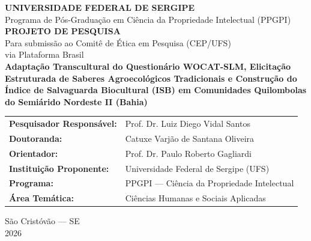 \documentclass[12pt,a4paper,brazil]{article}
\begin{document}
\begin{titlepage}
\centering
\vspace*{2cm}

{\Large\bfseries UNIVERSIDADE FEDERAL DE SERGIPE}\\[0.3cm]
{\large Programa de Pós-Graduação em Ciência da Propriedade Intelectual (PPGPI)}\\[2cm]

{\LARGE\bfseries PROJETO DE PESQUISA}\\[0.5cm]
{\large Para submissão ao Comitê de Ética em Pesquisa (CEP/UFS)\\via Plataforma Brasil}\\[2cm]

{\Large\bfseries Adaptação Transcultural do Questionário WOCAT-SLM, Elicitação Estruturada de Saberes Agroecológicos Tradicionais e Construção do Índice de Salvaguarda Biocultural (ISB) em Comunidades Quilombolas do Semiárido Nordeste II (Bahia)}\\[2.5cm]

\begin{tabular}{ll}
\textbf{Pesquisador Responsável:}  & Prof. Dr. Luiz Diego Vidal Santos \\
\textbf{Doutoranda:}               & Catuxe Varjão de Santana Oliveira \\
\textbf{Orientador:}               & Prof. Dr. Paulo Roberto Gagliardi \\
\textbf{Instituição Proponente:}   & Universidade Federal de Sergipe (UFS) \\
\textbf{Programa:}                 & PPGPI --- Ciência da Propriedade Intelectual \\
\textbf{Área Temática:}            & Ciências Humanas e Sociais Aplicadas \\
\end{tabular}

\vfill
São Cristóvão --- SE\\
2026
\end{titlepage}

\tableofcontents
\newpage

\end{document}
